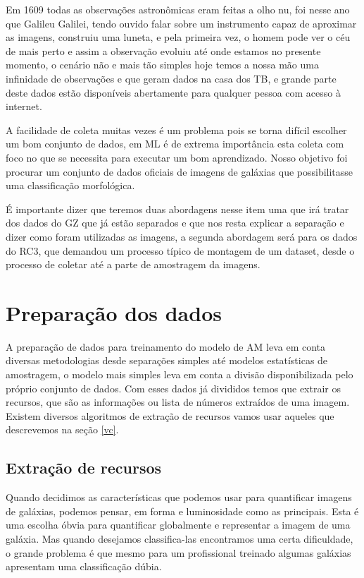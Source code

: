 Em 1609 todas as observações astronômicas eram feitas a olho nu, foi nesse ano que Galileu Galilei, tendo ouvido falar sobre um instrumento capaz de aproximar as imagens, construiu uma luneta, e pela primeira vez, o homem pode ver o céu de mais perto e assim a observação evoluiu até onde estamos no presente momento, o cenário não e mais tão simples hoje temos a nossa mão uma infinidade de observações e que geram dados na casa dos TB, e grande parte deste dados estão disponíveis abertamente para qualquer pessoa com acesso à internet.  

A facilidade de coleta muitas vezes é um problema pois se torna difícil escolher um bom conjunto de dados, em ML é de extrema importância esta coleta com foco no que se necessita para executar um bom aprendizado. Nosso objetivo foi procurar um conjunto de dados oficiais de imagens de galáxias que possibilitasse uma classificação morfológica.  

É importante dizer que teremos duas abordagens nesse item uma que irá tratar dos dados do GZ que já estão separados e que nos resta explicar a separação e dizer como foram utilizadas as imagens, a segunda abordagem será para os dados do RC3, que demandou um processo típico de montagem de um dataset, desde o processo de coletar até a parte de amostragem da imagens. 

\section{Preparação dos dados} 

A preparação de dados para treinamento do modelo de AM leva em conta diversas metodologias desde separações simples até modelos estatísticas de amostragem, o modelo mais simples leva em conta a divisão disponibilizada pelo próprio conjunto de dados. Com esses dados já divididos temos que extrair os recursos, que são as informações ou lista de números extraídos de uma imagem. Existem diversos algoritmos de extração de recursos vamos usar aqueles que descrevemos na seção \ref{vc}. 

\subsection{Extração de recursos}

Quando decidimos as características que podemos usar para quantificar imagens de galáxias, podemos pensar, em forma e luminosidade como as principais. Esta é uma escolha óbvia para quantificar globalmente e representar a imagem de uma galáxia. Mas quando desejamos classifica-las encontramos uma certa dificuldade, o grande problema é que mesmo para um profissional treinado algumas galáxias apresentam uma classificação dúbia.  

